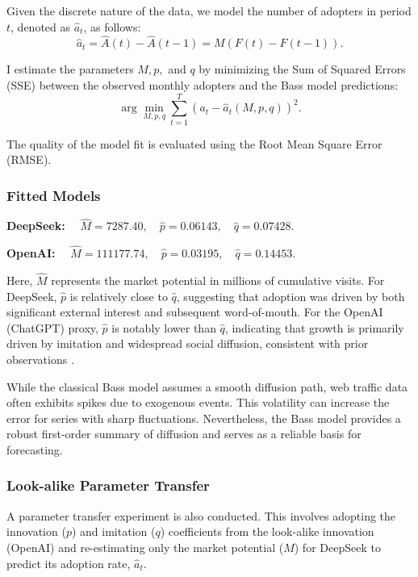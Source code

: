 \documentclass{article}
\begin{document}
Given the discrete nature of the data, we model the number of adopters in period $t$, denoted as $\hat{a}_t$, as follows:
$$
\hat{a}_t = \hat{A}(t) - \hat{A}(t-1) = M \left( F(t) - F(t-1) \right).
$$

I estimate the parameters $M, p,$ and $q$ by minimizing the Sum of Squared Errors (SSE) between the observed monthly adopters and the Bass model predictions:
$$
\arg \min_{M,p,q} \sum_{t=1}^T \left( a_t - \hat{a}_t(M,p,q) \right)^2.
$$

The quality of the model fit is evaluated using the Root Mean Square Error (RMSE).

\subsubsection{Fitted Models}
\label{subsubsec:fitted_models}

\textbf{DeepSeek:} $\quad \hat{M} = 7287.40, \quad \hat{p} = 0.06143, \quad \hat{q} = 0.07428.$

\noindent \textbf{OpenAI:} $\quad \hat{M} = 111177.74, \quad \hat{p} = 0.03195, \quad \hat{q} = 0.14453.$

\noindent Here, $\hat{M}$ represents the market potential in millions of cumulative visits. For DeepSeek, $\hat{p}$ is relatively close to $\hat{q}$, suggesting that adoption was driven by both significant external interest and subsequent word-of-mouth. For the OpenAI (ChatGPT) proxy, $\hat{p}$ is notably lower than $\hat{q}$, indicating that growth is primarily driven by imitation and widespread social diffusion, consistent with prior observations \cite{microsoft2025globalAI}.

While the classical Bass model assumes a smooth diffusion path, web traffic data often exhibits spikes due to exogenous events. This volatility can increase the error for series with sharp fluctuations. Nevertheless, the Bass model provides a robust first-order summary of diffusion and serves as a reliable basis for forecasting.

\subsubsection{Look-alike Parameter Transfer}
\label{subsubsec:parameter_transfer}
A parameter transfer experiment is also conducted. This involves adopting the innovation ($p$) and imitation ($q$) coefficients from the look-alike innovation (OpenAI) and re-estimating only the market potential ($M$) for DeepSeek to predict its adoption rate, $\hat{a}_t$.
\end{document}
